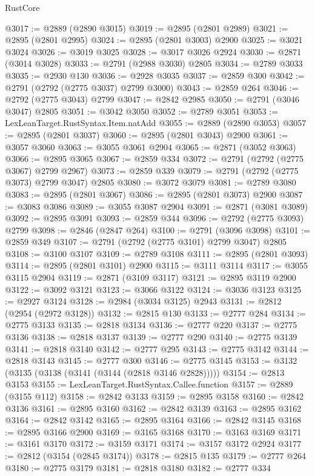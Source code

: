 \begin{lexlean}{RustCore}
\begin{coremodule}
@3017 := @2889 (@2890 @3015)
@3019 := @2895 (@2801 @2989)
@3021 := @2895 (@2801 @2995)
@3024 := @2895 (@2801 @3003) @2900
@3025 := @3021 @3024
@3026 := @3019 @3025
@3028 := @3017 @3026 @2924
@3030 := @2871 (@3014 @3028)
@3033 := @2791 (@2988 @3030) @2805
@3034 := @2789 @3033
@3035 := @2930 @130
@3036 := @2928 @3035
@3037 := @2859 @300
@3042 := @2791 (@2792 (@2775 @3037) @2799 @3000)
@3043 := @2859 @264
@3046 := @2792 (@2775 @3043) @2799
@3047 := @2842 @2985
@3050 := @2791 (@3046 @3047) @2805
@3051 := @3042 @3050
@3052 := @2789 @3051
@3053 := LexLeanTarget.RustSyntax.Item.natAdd
@3055 := @2889 (@2890 @3053)
@3057 := @2895 (@2801 @3037)
@3060 := @2895 (@2801 @3043) @2900
@3061 := @3057 @3060
@3063 := @3055 @3061 @2904
@3065 := @2871 (@3052 @3063)
@3066 := @2895 @3065
@3067 := @2859 @334
@3072 := @2791 (@2792 (@2775 @3067) @2799 @2967)
@3073 := @2859 @339
@3079 := @2791 (@2792 (@2775 @3073) @2799 @3047) @2805
@3080 := @3072 @3079
@3081 := @2789 @3080
@3083 := @2895 (@2801 @3067)
@3086 := @2895 (@2801 @3073) @2900
@3087 := @3083 @3086
@3089 := @3055 @3087 @2904
@3091 := @2871 (@3081 @3089)
@3092 := @2895 @3091
@3093 := @2859 @344
@3096 := @2792 (@2775 @3093) @2799
@3098 := @2846 (@2847 @264)
@3100 := @2791 (@3096 @3098)
@3101 := @2859 @349
@3107 := @2791 (@2792 (@2775 @3101) @2799 @3047) @2805
@3108 := @3100 @3107
@3109 := @2789 @3108
@3111 := @2895 (@2801 @3093)
@3114 := @2895 (@2801 @3101) @2900
@3115 := @3111 @3114
@3117 := @3055 @3115 @2904
@3119 := @2871 (@3109 @3117)
@3121 := @2895 @3119 @2900
@3122 := @3092 @3121
@3123 := @3066 @3122
@3124 := @3036 @3123
@3125 := @2927 @3124
@3128 := @2984 (@3034 @3125) @2943
@3131 := @2812 (@2954 (@2972 @3128))
@3132 := @2815 @130
@3133 := @2777 @284
@3134 := @2775 @3133
@3135 := @2818 @3134
@3136 := @2777 @220
@3137 := @2775 @3136
@3138 := @2818 @3137
@3139 := @2777 @290
@3140 := @2775 @3139
@3141 := @2818 @3140
@3142 := @2777 @295
@3143 := @2775 @3142
@3144 := @2818 @3143
@3145 := @2777 @300
@3146 := @2775 @3145
@3153 := @3132 (@3135 (@3138 (@3141 (@3144 (@2818 @3146 @2828)))))
@3154 := @2813 @3153
@3155 := LexLeanTarget.RustSyntax.Callee.function
@3157 := @2889 (@3155 @112)
@3158 := @2842 @3133
@3159 := @2895 @3158
@3160 := @2842 @3136
@3161 := @2895 @3160
@3162 := @2842 @3139
@3163 := @2895 @3162
@3164 := @2842 @3142
@3165 := @2895 @3164
@3166 := @2842 @3145
@3168 := @2895 @3166 @2900
@3169 := @3165 @3168
@3170 := @3163 @3169
@3171 := @3161 @3170
@3172 := @3159 @3171
@3174 := @3157 @3172 @2924
@3177 := @2812 (@3154 (@2845 @3174))
@3178 := @2815 @135
@3179 := @2777 @264
@3180 := @2775 @3179
@3181 := @2818 @3180
@3182 := @2777 @334

\end{coremodule}
\end{lexlean}

